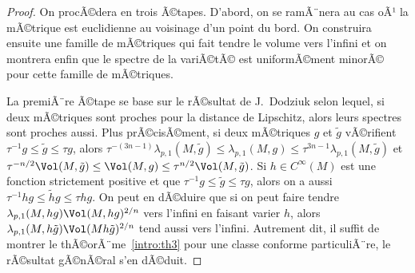 \documentclass[11pt,a4paper]{smfart}
\begin{document}
\begin{proof}
On procÃ©dera en trois Ã©tapes. D'abord, on se ramÃ¨nera au cas
oÃ¹ la mÃ©trique est euclidienne au voisinage d'un point du bord. 
On construira ensuite une famille de mÃ©triques qui fait tendre le volume
vers l'infini et on montrera enfin que le spectre de la variÃ©tÃ© est
uniformÃ©ment minorÃ© pour cette famille de mÃ©triques.

La premiÃ¨re Ã©tape se base sur le rÃ©sultat de J.~Dodziuk \cite{do82} selon 
lequel, si deux mÃ©triques sont proches pour la distance de Lipschitz, 
alors leurs spectres sont proches aussi. Plus prÃ©cisÃ©ment, si deux mÃ©triques 
$g$ et $\tilde g$ vÃ©rifient $\tau^{-1}g\leq\tilde g\leq\tau g$, 
alors $\tau^{-(3n-1)}\lambda_{p,1}(M,\tilde g)\leq\lambda_{p,1}(M,g)\leq
\tau^{3n-1}\lambda_{p,1}(M,\tilde g)$ et $\tau^{-n/2}\Vol(M,\tilde g)\leq
\Vol(M,g)\leq\tau^{n/2}\Vol(M,\tilde g)$. Si $h\in C^\infty(M)$ est 
une fonction strictement positive et que $\tau^{-1}g\leq\tilde g\leq\tau g$,
alors on a aussi $\tau^{-1}hg\leq\tilde hg\leq\tau hg$. On peut en dÃ©duire
que si on peut faire tendre $\lambda_{p,1}(M,hg)\Vol(M,hg)^{2/n}$
vers l'infini en faisant varier $h$, alors $\lambda_{p,1}(M,h\tilde g)
\Vol(Mh\tilde g)^{2/n}$ tend aussi vers l'infini. Autrement dit, il suffit
de montrer le thÃ©orÃ¨me~\ref{intro:th3} pour une classe conforme particuliÃ¨re,
le rÃ©sultat gÃ©nÃ©ral s'en dÃ©duit.


\end{proof}
\end{document}

